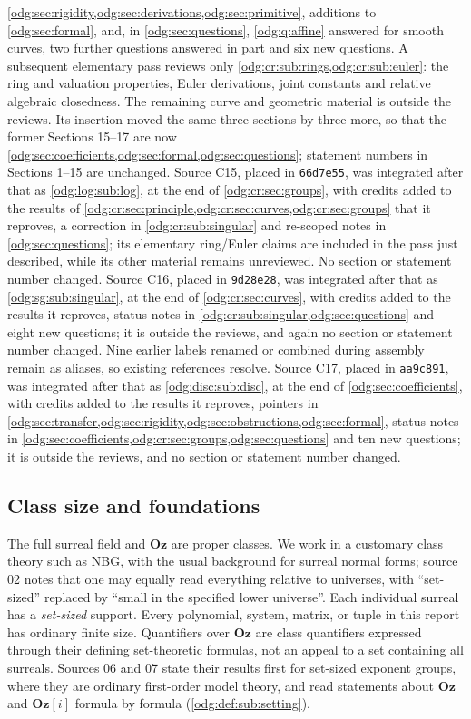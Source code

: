 \documentclass[11pt,oneside]{article}
\numberwithin{equation}{section}
\theoremstyle{definition}
\theoremstyle{remark}
\newcommand{\Oz}{\mathbf{Oz}}
\newcommand{\Og}{\Oz[i]}
\begin{document}
\cref{odg:sec:rigidity,odg:sec:derivations,odg:sec:primitive}, additions to
\cref{odg:sec:formal}, and, in \cref{odg:sec:questions}, \cref{odg:q:affine}
answered for smooth curves, two further questions answered in part and six new
questions. A subsequent elementary pass reviews only
\cref{odg:cr:sub:rings,odg:cr:sub:euler}: the ring and valuation properties,
Euler derivations, joint constants and relative algebraic closedness.
The remaining curve and geometric material is outside the reviews. Its
insertion moved the same three sections by three more, so that the former Sections
15--17 are now \cref{odg:sec:coefficients,odg:sec:formal,odg:sec:questions};
statement numbers in Sections 1--15 are unchanged. Source C15, placed in
\texttt{66d7e55}, was integrated after that as \cref{odg:log:sub:log}, at the end of
\cref{odg:cr:sec:groups}, with credits added to the results of
\cref{odg:cr:sec:principle,odg:cr:sec:curves,odg:cr:sec:groups} that it reproves, a
correction in \cref{odg:cr:sub:singular} and re-scoped notes in
\cref{odg:sec:questions}; its elementary ring/Euler claims are included in
the pass just described, while its other material remains unreviewed. No section or
statement number changed. Source C16, placed in \texttt{9d28e28}, was integrated after that as
\cref{odg:sg:sub:singular}, at the end of \cref{odg:cr:sec:curves}, with credits added to
the results it reproves, status notes in \cref{odg:cr:sub:singular,odg:sec:questions} and
eight new questions; it is outside the reviews, and again no section or statement number
changed. Nine earlier
labels renamed or combined during assembly remain as aliases, so existing
references resolve.
Source C17, placed in \texttt{aa9c891}, was integrated after that as \cref{odg:disc:sub:disc},
at the end of \cref{odg:sec:coefficients}, with credits added to the results it reproves,
pointers in \cref{odg:sec:transfer,odg:sec:rigidity,odg:sec:obstructions,odg:sec:formal},
status notes in \cref{odg:sec:coefficients,odg:cr:sec:groups,odg:sec:questions} and ten new
questions; it is outside the reviews, and no section or statement number changed.

\subsection{Class size and foundations}\label{odg:sub:foundations}

The full surreal field and $\Oz$ are proper classes. We work in a customary
class theory such as NBG, with the usual background for surreal normal forms;
source 02 notes that one may equally read everything relative to universes,
with ``set-sized'' replaced by ``small in the specified lower universe''. Each
individual surreal has a \emph{set-sized} support. Every polynomial, system,
matrix, or tuple in this report has ordinary finite size. Quantifiers over
$\Oz$ are class quantifiers expressed through their defining set-theoretic
formulas, not an appeal to a set containing all surreals. Sources 06 and 07
state their results first for set-sized exponent groups, where they are
ordinary first-order model theory, and read statements about $\Oz$ and $\Og$
formula by formula (\cref{odg:def:sub:setting}).
\end{document}
